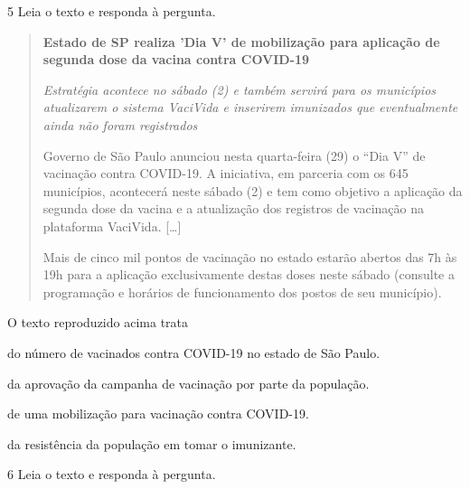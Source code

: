 \num{5} Leia o texto e responda à pergunta.

\begin{quote}
\textbf{Estado de SP realiza 'Dia V' de mobilização para aplicação de
segunda dose da vacina contra COVID-19}

\textit{Estratégia acontece no sábado (2) e também servirá para os
municípios atualizarem o sistema VaciVida e inserirem imunizados que
eventualmente ainda não foram registrados}

Governo de São Paulo anunciou nesta quarta-feira (29) o ``Dia V'' de
vacinação contra COVID-19. A iniciativa, em parceria com os 645
municípios, acontecerá neste sábado (2) e tem como objetivo a aplicação
da segunda dose da vacina e a atualização dos registros de vacinação na
plataforma VaciVida. {[}\ldots{}{]}

Mais de cinco mil pontos de vacinação no estado estarão abertos das 7h
às 19h para a aplicação exclusivamente destas doses neste sábado
(consulte a programação e horários de funcionamento dos postos de seu
município).

\end{quote}

O texto reproduzido acima trata

\begin{escolha}
  \item do número de vacinados contra COVID-19 no estado de São Paulo.

  \item da aprovação da campanha de vacinação por parte da população.

  \item de uma mobilização para vacinação contra COVID-19.

  \item da resistência da população em tomar o imunizante.
\end{escolha}

\num{6} Leia o texto e responda à pergunta.

